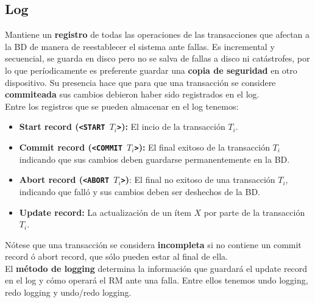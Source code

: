 \subsection*{Log}
Mantiene un \textbf{registro} de todas las operaciones de las transacciones que afectan a la BD de manera de reestablecer el sistema ante fallas. Es incremental y secuencial, se guarda en disco pero no se salva de fallas a disco ni catástrofes, por lo que períodicamente es preferente guardar una \textbf{copia de seguridad} en otro dispositivo. Su presencia hace que para que una transacción se considere \textbf{commiteada} sus cambios debieron haber sido registrados en el log. \\
Entre los registros que se pueden almacenar en el log tenemos:
\begin{itemize}
    \item \textbf{Start record (\texttt{<START $T_i$>}):} El incio de la transacción $T_i$.
    \item \textbf{Commit record (\texttt{<COMMIT $T_i$>}):} El final exitoso de la transacción $T_i$ indicando que sus cambios deben guardarse permanentemente en la BD.
    \item \textbf{Abort record (\texttt{<ABORT $T_i$>})}: El final no exitoso de una transacción $T_i$, indicando que falló y sus cambios deben ser deshechos de la BD.
    \item \textbf{Update record:} La actualización de un ítem $X$ por parte de la transacción $T_i$.
\end{itemize}
Nótese que una transacción se considera \textbf{incompleta} si no contiene un commit record ó abort record, que sólo pueden estar al final de ella. \\
El \textbf{método de logging} determina la información que guardará el update record en el log y cómo operará el RM ante una falla. Entre ellos tenemos undo logging, redo logging y undo/redo logging.

